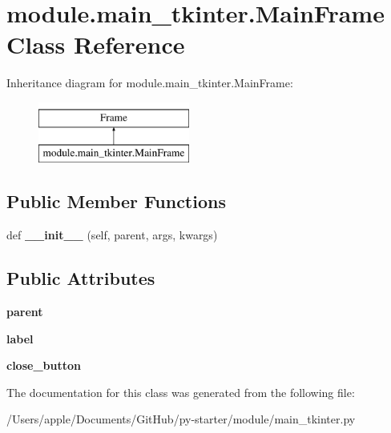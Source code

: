 \hypertarget{classmodule_1_1main__tkinter_1_1_main_frame}{}\section{module.\+main\+\_\+tkinter.\+Main\+Frame Class Reference}
\label{classmodule_1_1main__tkinter_1_1_main_frame}
Inheritance diagram for module.\+main\+\_\+tkinter.\+Main\+Frame\+:\begin{figure}[H]
\begin{center}
\leavevmode
\includegraphics[height=2.000000cm]{classmodule_1_1main__tkinter_1_1_main_frame}
\end{center}
\end{figure}
\subsection*{Public Member Functions}
\begin{DoxyCompactItemize}
\item 
\mbox{\label{classmodule_1_1main__tkinter_1_1_main_frame_aad46c64102fe51ec479d8b099e0f7db6}} 
def {\bfseries \+\_\+\+\_\+init\+\_\+\+\_\+} (self, parent, args, kwargs)
\end{DoxyCompactItemize}
\subsection*{Public Attributes}
\begin{DoxyCompactItemize}
\item 
\mbox{\label{classmodule_1_1main__tkinter_1_1_main_frame_ae2685665dc8bf7b6af9bca1100272b2b}} 
{\bfseries parent}
\item 
\mbox{\label{classmodule_1_1main__tkinter_1_1_main_frame_a0e77ba421a2a0032e64ac56675b43b59}} 
{\bfseries label}
\item 
\mbox{\label{classmodule_1_1main__tkinter_1_1_main_frame_af6b6e986fae014d58716a59704a0fd61}} 
{\bfseries close\+\_\+button}
\end{DoxyCompactItemize}


The documentation for this class was generated from the following file\+:\begin{DoxyCompactItemize}
\item 
/\+Users/apple/\+Documents/\+Git\+Hub/py-\/starter/module/main\+\_\+tkinter.\+py\end{DoxyCompactItemize}
